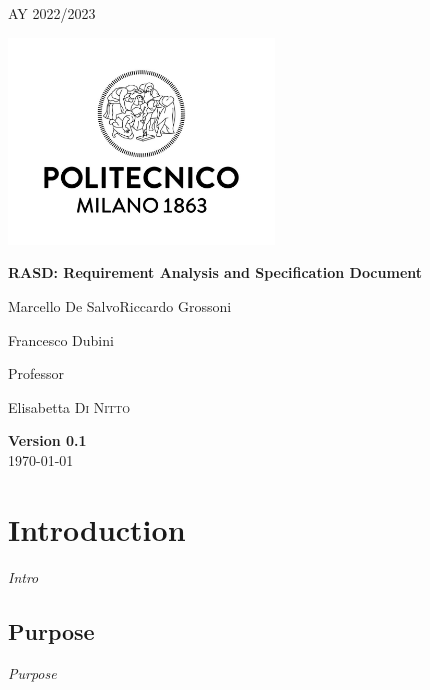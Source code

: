 \documentclass[table, 12pt]{article} %
\begin{document}
    
    \begin{titlepage}
        \centering
        {\scshape\large AY 2022/2023 \par}
        \vfill
        \includegraphics[width=200pt]{assets/logo_polimi}\par\vspace{1cm}
        \vspace{0.5cm}
        {\huge\bfseries RASD\@: Requirement Analysis
            and Specification Document \par}
        \vspace{1cm}
        {\large {Marcello De Salvo\quad Riccardo Grossoni \par Francesco Dubini}\par}
        \vfill
        {\large Professor\par
            Elisabetta \textsc{Di Nitto}}
        \vfill
        {\large \textbf{Version 0.1}\\ \today \par}
    \end{titlepage}
    
    \thispagestyle{plain}

    \mbox{}

    \newpage
    \tableofcontents

    \newpage

    \section{Introduction}
        \emph{Intro}
    
    \subsection{Purpose} %
        \emph{Purpose} 
\end{document}
